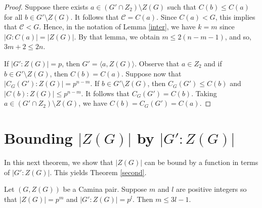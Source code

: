 \begin{proof}
Suppose there exists $a \in (G' \cap Z_2) \setminus Z (G)$ such that $C (b) \le C (a)$ for all $b \in G' \setminus Z (G)$.  It follows that ${\mathcal C} = C (a)$.  Since $C (a) < G$, this implies that ${\mathcal C} < G$.
Hence, in the notation of Lemma \ref{inter}, we have $k = m$ since $|G:C (a)| = |Z (G)|$.  By that lemma, we obtain $m \le 2(n - m - 1)$, and so, $3m + 2 \le 2n$.

If $|G':Z(G)| = p$, then $G' = \langle a, Z (G) \rangle$.  Observe that $a \in Z_2$ and if $b \in G' \setminus Z(G)$, then $C (b) = C (a)$.  Suppose now that $|C_G (G'):Z (G)| = p^{n-m}$.  If $b \in G' \setminus Z (G)$, then $C_G (G') \le C (b)$ and $|C (b):Z (G)| \le p^{n-m}$.  It follows that $C_G (G') = C (b)$.  Taking $a \in (G' \cap Z_2) \setminus Z (G)$, we have $C (b) = C_G (G') = C (a)$.
\end{proof}

\section{Bounding $|Z(G)|$ by $|G':Z (G)|$}

In this next theorem, we show that $|Z (G)|$ can be bound by a function in terms of $|G':Z (G)|$.  This yields Theorem \ref{second}.

\begin{theorem}\label{derived bound}
Let $(G,Z (G))$ be a Camina pair.  Suppose $m$ and $l$ are positive integers so that $|Z (G)| = p^m$ and $|G':Z (G)| = p^l$.  Then $m \le 3l - 1$.
\end{theorem}

